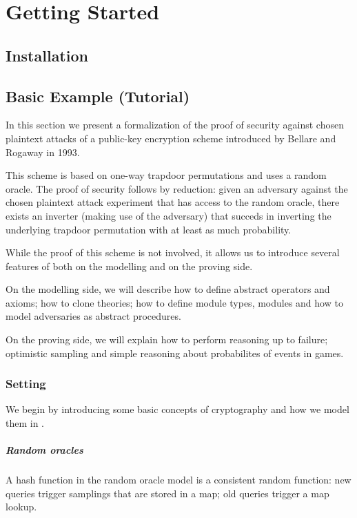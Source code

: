 
\chapter{Getting Started}
\section{Installation}

\section{Basic Example (Tutorial)}
In this section we present a formalization of the proof of security
against chosen plaintext attacks of a public-key encryption scheme
introduced by Bellare and Rogaway in 1993\cite{br93}.

This scheme is based on one-way trapdoor permutations and uses a
random oracle. The proof of security follows by reduction: given an
adversary against the chosen plaintext attack experiment that has
access to the random oracle, there exists an inverter (making use of
the adversary) that succeds in inverting the underlying trapdoor
permutation with at least as much probability.

While the proof of this scheme is not involved, it allows us to
introduce several features of \EC both on the modelling and on
the proving side.

On the modelling side, we will describe how to define abstract operators
and axioms; how to clone theories; how to define module types, modules
and how to model adversaries as abstract procedures.

On the proving side, we will explain how to perform reasoning up to
failure; optimistic sampling and simple reasoning about probabilites
of events in games.

\subsection{Setting}
We begin by introducing some basic concepts of cryptography and how we
model them in \EC.

\paragraph{Random oracles}
A hash function in the random oracle model is a consistent random
function: new queries trigger samplings that are stored in a map; old
queries trigger a map lookup. 

